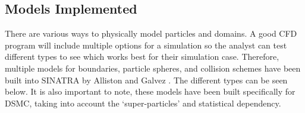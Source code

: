 \subsection{Models Implemented}
\label{sec:models}

There are various ways to physically model particles and domains. A good CFD program will include multiple options for a simulation so the analyst can test different types to see which works best for their simulation case. Therefore, multiple models for boundaries, particle spheres, and collision schemes have been built into SINATRA by Alliston and Galvez \cite{Galvez2018a} \cite{mac_thesis}. The different types can be seen below. It is also important to note, these models have been built specifically for DSMC, taking into account the `super-particles' and statistical dependency. 


